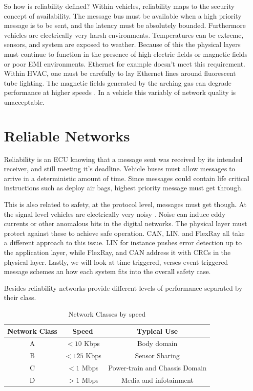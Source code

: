 \documentclass[conference,12pt]{IEEEtran}
\begin{document}
So how is reliability defined? Within vehicles, reliability maps to the
security concept of availability. The message bus must be available when a high
priority message is to be sent, and the latency must be absolutely bounded.
Furthermore vehicles are electrically very harsh environments. Temperatures can
be extreme, sensors, and system are exposed to weather. Because of this the
physical layers must continue to function in the presence of high electric
fields or magnetic fields or poor EMI environments.  Ethernet for example doesn't meet
this requirement. Within HVAC, one must be carefully to lay Ethernet lines around
fluorescent tube lighting. The magnetic fields generated by the
arching gas can degrade performance at higher speeds
\autocite{center_interesting_ethernet}. In a vehicle this
variably of network quality is unacceptable. 


\section{Reliable Networks}
Reliability is an ECU knowing that
a message sent was received by its intended receiver, and still meeting it's
deadline. Vehicle buses
must allow messages to arrive in a deterministic amount of time. Since messages
could contain life critical instructions such as deploy air bags, highest
priority message must get through. 

This is also related to safety, at the
protocol level, messages must get though. At the signal level vehicles are
electrically very noisy \autocite{paruchuri_inter-vehicular_2011}. Noise can
induce eddy currents or other anomalous bits
in the digital networks. The physical layer must protect against these to
achieve safe operation.  CAN, LIN, and FlexRay all take a different approach to
this issue. LIN for instance pushes error detection up to the application layer,
while FlexRay, and CAN address it with CRCs in the physical layer. Lastly, we will look at time triggered,
verses event triggered message schemes an how each system fits into the overall
safety case. 

Besides reliability networks provide different levels of performance separated by
their class.
\begin{table}[!t]
\renewcommand{\arraystretch}{1.3}
\caption{Network Classes by speed}
\label{tbl:network_classes}
\centering
\begin{tabular}{c c c}
\hline
\bfseries Network Class & \bfseries Speed & \bfseries Typical Use \\ \hline
\hline
A & $< 10$ Kbps  & Body domain \\
B & $< 125$ Kbps & Sensor Sharing \\
C & $< 1$ Mbps   & Power-train and Chassis Domain \\
D & $> 1$ Mbps    & Media and infotainment \\
\hline
\end{tabular}
\end{table}
\end{document}
